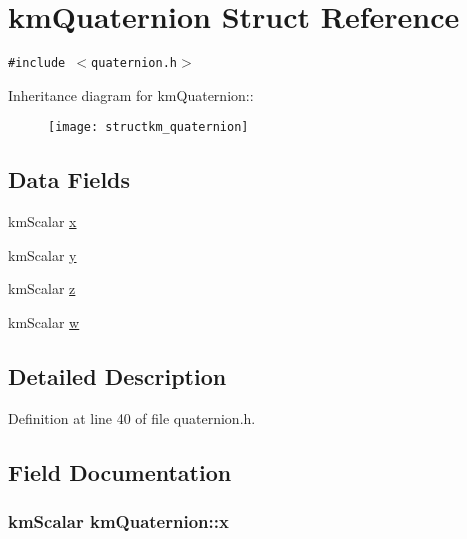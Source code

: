 \hypertarget{structkm_quaternion}{
\section{kmQuaternion Struct Reference}
\label{structkm_quaternion}
}
{\tt \#include $<$quaternion.h$>$}

Inheritance diagram for kmQuaternion::\begin{figure}[H]
\begin{center}
\leavevmode
\texttt{[image: structkm\_quaternion]}
\end{center}
\end{figure}
\subsection*{Data Fields}
\begin{CompactItemize}
\item 
kmScalar \hyperlink{structkm_quaternion_e9cf860e36fa206f8c122f084ab7042d}{x}
\item 
kmScalar \hyperlink{structkm_quaternion_6cb097db1a5e24c5e6d7a673dd9b5c68}{y}
\item 
kmScalar \hyperlink{structkm_quaternion_63b2d2685be9e41190fdf45bf21e6690}{z}
\item 
kmScalar \hyperlink{structkm_quaternion_3278d1a1de6f6d29ca9fa08bde51e726}{w}
\end{CompactItemize}


\subsection{Detailed Description}


Definition at line 40 of file quaternion.h.

\subsection{Field Documentation}
\hypertarget{structkm_quaternion_e9cf860e36fa206f8c122f084ab7042d}{
\subsubsection[x]{\setlength{\rightskip}{0pt plus 5cm}kmScalar {\bf kmQuaternion::x}}}
\label{structkm_quaternion_e9cf860e36fa206f8c122f084ab7042d}




